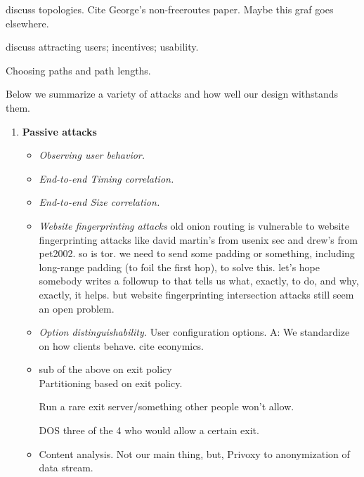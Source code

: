 \documentclass[times,10pt,twocolumn]{article}
\begin{document}
discuss topologies. Cite George's non-freeroutes paper.  Maybe this
graf goes elsewhere.

discuss attracting users; incentives; usability.

Choosing paths and path lengths.


\label{sec:attacks}

Below we summarize a variety of attacks and how well our design withstands
them.

\begin{enumerate}
\item \textbf{Passive attacks}
\begin{itemize}
\item \emph{Observing user behavior.}
\item \emph{End-to-end Timing correlation.}
\item \emph{End-to-end Size correlation.}
\item \emph{Website fingerprinting attacks} old onion routing is
vulnerable to website fingerprinting attacks like david martin's
from usenix sec and drew's from pet2002. so is tor. we need to send
some padding or something, including long-range padding (to foil the
first hop), to solve this. let's hope somebody writes a followup to
\cite{defensive-dropping} that tells us what, exactly, to do, and why,
exactly, it helps. but website fingerprinting intersection attacks
\cite{dogan:pet2002} still seem an open problem.

\item \emph{Option distinguishability.} User configuration options.
A: We standardize on how clients behave. cite econymics.

\item sub of the above on exit policy\\
Partitioning based on exit policy.

Run a rare exit server/something other people won't allow.

DOS three of the 4 who would allow a certain exit.

\item Content analysis. Not our main thing, but, Privoxy to
  anonymization of data stream.


\end{itemize}


\end{enumerate}
\end{document}
